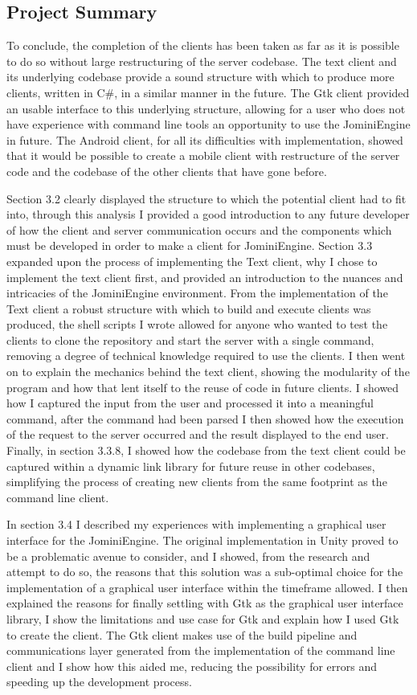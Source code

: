 \documentclass{article}
\begin{document}
\subsection{Project Summary}
To conclude, the completion of the clients has been taken as far as it is possible to do so without large restructuring of the server codebase. The text client and its underlying codebase provide a sound structure with which to produce more clients, written in C\#, in a similar manner in the future. The Gtk client provided an usable interface to this underlying structure, allowing for a user who does not have experience with command line tools an opportunity to use the JominiEngine in future. The Android client, for all its difficulties with implementation, showed that it would be possible to create a mobile client with restructure of the server code and the codebase of the other clients that have gone before.

Section 3.2 clearly displayed the structure to which the potential client had to fit into, through this analysis I provided a good introduction to any future developer of how the client and server communication occurs and the components which must be developed in order to make a client for JominiEngine. Section 3.3 expanded upon the process of implementing the Text client, why I chose to implement the text client first, and provided an introduction to the nuances and intricacies of the JominiEngine environment. From the implementation of the Text client a robust structure with which to build and execute clients was produced, the shell scripts I wrote allowed for anyone who wanted to test the clients to clone the repository and start the server with a single command, removing a degree of technical knowledge required to use the clients. I then went on to explain the mechanics behind the text client, showing the modularity of the program and how that lent itself to the reuse of code in future clients. I showed how I captured the input from the user and processed it into a meaningful command, after the command had been parsed I then showed how the execution of the request to the server occurred and the result displayed to the end user. Finally, in section 3.3.8, I showed how the codebase from the text client could be captured within a dynamic link library for future reuse in other codebases, simplifying the process of creating new clients from the same footprint as the command line client.

In section 3.4 I described my experiences with implementing a graphical user interface for the JominiEngine. The original implementation in Unity proved to be a problematic avenue to consider, and I showed, from the research and attempt to do so, the reasons that this solution was a sub-optimal choice for the implementation of a graphical user interface within the timeframe allowed. I then explained the reasons for finally settling with Gtk as the graphical user interface library, I show the limitations and use case for Gtk and explain how I used Gtk to create the client. The Gtk client makes use of the build pipeline and communications layer generated from the implementation of the command line client and I show how this aided me, reducing the possibility for errors and speeding up the development process.
\end{document}
